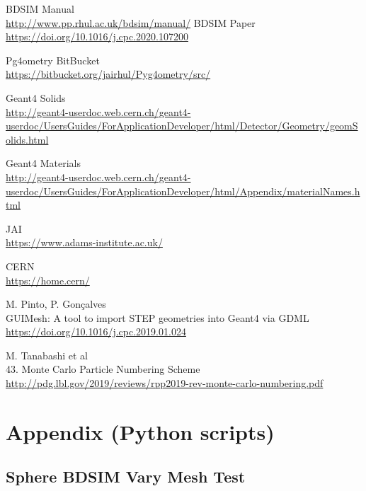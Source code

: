 \documentclass[12pt,a4paper]{article}
\begin{document}


\newpage
\begin{thebibliography}{1}

	\bibitem{}
		BDSIM Manual\\
		\url{http://www.pp.rhul.ac.uk/bdsim/manual/}
	\bibitem{}
		BDSIM Paper\\
		\url{https://doi.org/10.1016/j.cpc.2020.107200}
		
	\bibitem{}
		Pg4ometry BitBucket\\
		\url{https://bitbucket.org/jairhul/Pyg4ometry/src/}
		
	\bibitem{}
	Geant4 Solids\\
	\url{http://geant4-userdoc.web.cern.ch/geant4-userdoc/UsersGuides/ForApplicationDeveloper/html/Detector/Geometry/geomSolids.html}
	
	Geant4 Materials\\
	\url{http://geant4-userdoc.web.cern.ch/geant4-userdoc/UsersGuides/ForApplicationDeveloper/html/Appendix/materialNames.html}
	
	JAI\\
	\url{https://www.adams-institute.ac.uk/}
	
	CERN\\
	\url{https://home.cern/}
	
	M. Pinto, P. Gon\c{c}alves\\
	GUIMesh: A tool to import STEP geometries into Geant4 via GDML\\
	\url{https://doi.org/10.1016/j.cpc.2019.01.024}
		
	M. Tanabashi et al\\
	43. Monte Carlo Particle Numbering Scheme\\
	\url{http://pdg.lbl.gov/2019/reviews/rpp2019-rev-monte-carlo-numbering.pdf}
	
\end{thebibliography}



\newpage
\appendix

\section{Appendix (Python scripts)}
\subsection{Sphere BDSIM Vary Mesh Test}
\label{ap1}

\end{document}
